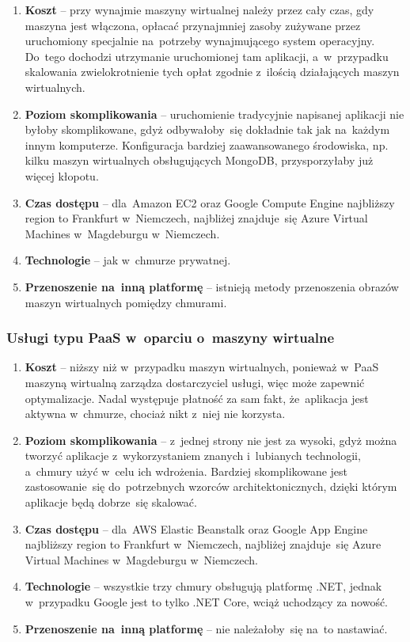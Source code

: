 \documentclass[12pt,a4paper,twoside,titlepage,openright]{book}
\begin{document}
\begin{enumerate}
	\item \textbf{Koszt} -- przy wynajmie maszyny wirtualnej należy przez cały czas, gdy maszyna jest włączona, opłacać przynajmniej zasoby zużywane przez uruchomiony specjalnie na~potrzeby wynajmującego system operacyjny. Do~tego dochodzi utrzymanie uruchomionej tam aplikacji, a~w~przypadku skalowania zwielokrotnienie tych opłat zgodnie z~ilością działających maszyn wirtualnych.
	\item \textbf{Poziom skomplikowania} -- uruchomienie tradycyjnie napisanej aplikacji nie byłoby skomplikowane, gdyż odbywałoby~się dokładnie tak jak na~każdym innym komputerze. Konfiguracja bardziej zaawansowanego środowiska, np. kilku maszyn wirtualnych obsługujących MongoDB, przysporzyłaby już więcej kłopotu.
	\item \textbf{Czas dostępu} -- dla~Amazon EC2 oraz Google Compute Engine najbliższy region to Frankfurt w~Niemczech, najbliżej znajduje~się Azure Virtual Machines w~Magdeburgu w~Niemczech.
	\item \textbf{Technologie} -- jak w~chmurze prywatnej.
	\item \textbf{Przenoszenie na~inną platformę} -- istnieją metody przenoszenia obrazów maszyn wirtualnych pomiędzy chmurami.
\end{enumerate}


\subsubsection{Usługi typu PaaS w~oparciu o~maszyny wirtualne}

\begin{enumerate}
	\item \textbf{Koszt} -- niższy niż w~przypadku maszyn wirtualnych, ponieważ w~PaaS maszyną wirtualną zarządza dostarczyciel usługi, więc może zapewnić optymalizacje. Nadal występuje płatność za sam fakt, że~aplikacja jest aktywna w~chmurze, chociaż nikt z~niej nie korzysta.
	\item \textbf{Poziom skomplikowania} -- z~jednej strony nie jest za wysoki, gdyż można tworzyć aplikacje z~wykorzystaniem znanych i~lubianych technologii, a~chmury użyć w~celu ich wdrożenia. Bardziej skomplikowane jest zastosowanie~się do~potrzebnych wzorców architektonicznych, dzięki którym aplikacje będą dobrze~się skalować.
	\item \textbf{Czas dostępu} -- dla~AWS Elastic Beanstalk oraz Google App Engine najbliższy region to Frankfurt w~Niemczech, najbliżej znajduje~się Azure Virtual Machines w~Magdeburgu w~Niemczech.
	\item \textbf{Technologie} -- wszystkie trzy chmury obsługują platformę .NET, jednak w~przypadku Google jest to tylko .NET Core, wciąż uchodzący za nowość.
	\item \textbf{Przenoszenie na~inną platformę} -- nie należałoby~się na~to nastawiać.
\end{enumerate}
\end{document}

